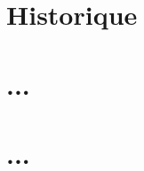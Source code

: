 \documentclass[12pt,oneside]{report}
\begin{document}
\begin{spacing}{1.2}
\section{Historique}



\section{...}



\section{...}



\end{spacing}
\end{document}
